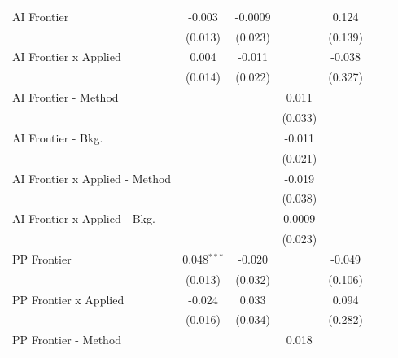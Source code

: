 \begin{tabular}{lcccccc}
   AI Frontier                    & -0.003        & -0.0009       &               & 0.124         &        &   \\   
                                  & (0.013)       & (0.023)       &               & (0.139)       &        &   \\   
   AI Frontier x Applied          & 0.004         & -0.011        &               & -0.038        &        &   \\   
                                  & (0.014)       & (0.022)       &               & (0.327)       &        &   \\   
   AI Frontier - Method           &               &               & 0.011         &               &        &   \\   
                                  &               &               & (0.033)       &               &        &   \\   
   AI Frontier - Bkg.             &               &               & -0.011        &               &        &   \\   
                                  &               &               & (0.021)       &               &        &   \\   
   AI Frontier x Applied - Method &               &               & -0.019        &               &        &   \\   
                                  &               &               & (0.038)       &               &        &   \\   
   AI Frontier x Applied - Bkg.   &               &               & 0.0009        &               &        &   \\   
                                  &               &               & (0.023)       &               &        &   \\   
   PP Frontier                    & 0.048$^{***}$ & -0.020        &               & -0.049        &        &   \\   
                                  & (0.013)       & (0.032)       &               & (0.106)       &        &   \\   
   PP Frontier x Applied          & -0.024        & 0.033         &               & 0.094         &        &   \\   
                                  & (0.016)       & (0.034)       &               & (0.282)       &        &   \\   
   PP Frontier - Method           &               &               & 0.018         &               &        &   \\   

\end{tabular}
